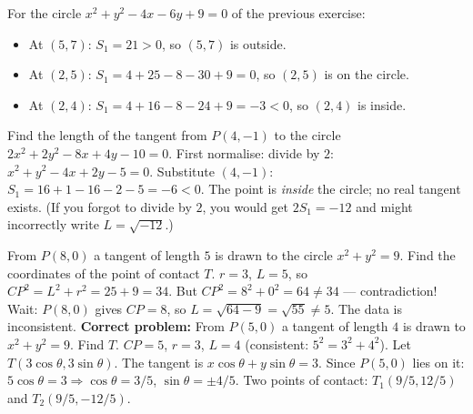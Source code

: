 \documentclass[11pt]{article}
\begin{document}
\begin{exemplebox}
For the circle $x^2 + y^2 - 4x - 6y + 9 = 0$ of the previous exercise:
\begin{itemize}
\item At $(5,7)$: $S_1 = 21 > 0$, so $(5,7)$ is outside.
\item At $(2, 5)$: $S_1 = 4 + 25 - 8 - 30 + 9 = 0$, so $(2,5)$ is on the circle.
\item At $(2, 4)$: $S_1 = 4 + 16 - 8 - 24 + 9 = -3 < 0$, so $(2,4)$ is inside.
\end{itemize}
\end{exemplebox}

\begin{exemplebox}
Find the length of the tangent from $P(4, -1)$ to the circle $2x^2 + 2y^2 - 8x + 4y - 10 = 0$.
\tcblower
First normalise: divide by $2$: $x^2 + y^2 - 4x + 2y - 5 = 0$.
Substitute $(4, -1)$:
$S_1 = 16 + 1 - 16 - 2 - 5 = -6 < 0$.
The point is \emph{inside} the circle; no real tangent exists.
(If you forgot to divide by $2$, you would get $2S_1 = -12$ and might incorrectly write $L = \sqrt{-12}$.)
\end{exemplebox}

\begin{exemplebox}
From $P(8, 0)$ a tangent of length $5$ is drawn to the circle $x^2 + y^2 = 9$. Find the coordinates of the point of contact $T$.
\tcblower
$r=3$, $L=5$, so $CP^2 = L^2 + r^2 = 25 + 9 = 34$. But $CP^2 = 8^2 + 0^2 = 64 \ne 34$ — contradiction!
Wait: $P(8,0)$ gives $CP=8$, so $L = \sqrt{64-9} = \sqrt{55} \ne 5$. The data is inconsistent.
\textbf{Correct problem:} From $P(5,0)$ a tangent of length $4$ is drawn to $x^2+y^2=9$. Find $T$.
$CP=5$, $r=3$, $L=4$ (consistent: $5^2=3^2+4^2$).
Let $T(3\cos\theta, 3\sin\theta)$. The tangent is $x\cos\theta + y\sin\theta = 3$.
Since $P(5,0)$ lies on it: $5\cos\theta = 3 \Rightarrow \cos\theta = 3/5$, $\sin\theta = \pm 4/5$.
Two points of contact: $T_1(9/5, 12/5)$ and $T_2(9/5, -12/5)$.
\end{exemplebox}
\end{document}
